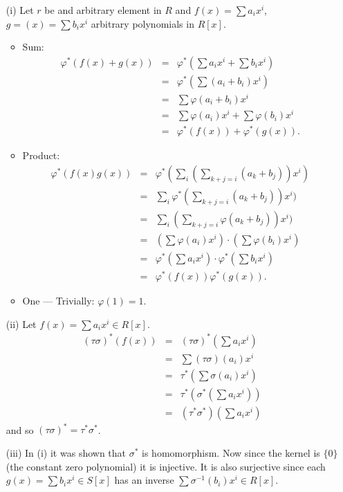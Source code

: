 \begin{myenumerate}
\begin{itemize}
 \item[(i)]
   Let $r$ be and arbitrary element in $R$
   and  \(f(x)=\sum a_ix^i\),  \(g=(x)=\sum b_ix^i\)
   arbitrary polynomials in \(R[x]\).
   \begin{itemize}
    \item
      Sum:
      \begin{eqnarray*}
        \varphi^*(f(x)+g(x))
        & = & \varphi^*\left( \sum a_i x^i +  \sum b_i x^i\right) \\
        & = & \varphi^*( \sum (a_i + b_i) x^i ) \\
        & = & \sum \varphi(a_i + b_i) x^i  \\
        & = & \sum \varphi(a_i) x^i + \sum \varphi(b_i) x^i  \\
        & = & \varphi^*(f(x))+ \varphi^*(g(x)).
      \end{eqnarray*}
    \item
      Product:
      \begin{eqnarray*}
        \varphi^*(f(x)g(x))
        & = & \varphi^*\left(
                 \sum_i \left(\sum_{k+j=i} (a_k+b_j)\right) x^i
                       \right) \\
        & = & \sum_i \varphi^*\left(\sum_{k+j=i} (a_k+b_j)\right) x^i ) \\
        & = & \sum_i \left(\sum_{k+j=i} \varphi(a_k+b_j)\right) x^i ) \\
        & = & \left(\sum \varphi(a_i) x^i\right) \cdot
              \left(\sum \varphi(b_i) x^i\right) \\
        & = & \varphi^*\left(\sum a_i x^i\right) \cdot
              \varphi^*\left(\sum b_i x^i\right) \\
        & = & \varphi^*(f(x)) \varphi^*(g(x)).
      \end{eqnarray*}
    \item
      One --- Trivially:  \(\varphi(1) = 1\).
   \end{itemize}
 \item[(ii)]
    Let \(f(x)=\sum a_ix^i\in R[x]\).
    \begin{eqnarray*}
    (\tau\sigma)^*(f(x))
     & = & (\tau\sigma)^*\left(\sum a_i x^i\right) \\
     & = & \sum (\tau\sigma)(a_i) x^i \\
     & = & \tau^*\left(\sum \sigma(a_i) x^i\right) \\
     & = & \tau^*\left(\sigma^*\left(\sum a_i x^i\right)\right) \\
     & = & (\tau^*\sigma^*)\left(\sum a_i x^i\right)
    \end{eqnarray*}
    and so \((\tau\sigma)^* = \tau^*\sigma^*\).
 \item[(iii)]
    In (i) it was shown that \(\sigma^*\) is homomorphism.
    Now since the kernel is \(\{0\}\) (the constant zero polynomial)
    it is injective. It is also surjective since each
    \(g(x)=\sum b_ix^i \in S[x]\) has an inverse
    \(\sum \sigma^{-1}(b_i)x^i \in R[x]\).


\end{itemize}
\end{myenumerate}
